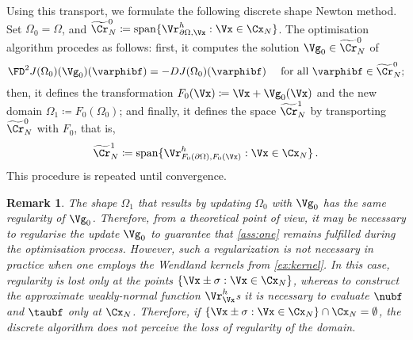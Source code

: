 \documentclass{siamart1116}
\newtheorem{remark}[theorem]{Remark}
\numberwithin{theorem}{section}
\begin{document}
Using this transport, we formulate the following discrete shape Newton method.
Set $\Omega_{0} = \Omega$, and
$\widetilde\Cr_N^0 \coloneqq \mathrm{span}\{\Vr^h_{\partial \Omega,\Vx}: \Vx\in \Cx_N\}$.
The optimisation algorithm procedes as follows:
first, it computes the solution $\Vg_0\in \widetilde\Cr_N^0$ of
\begin{equation}\label{eq:newton}
\FD^2J(\Omega_0)(\Vg_0)(\varphibf) = - DJ(\Omega_0)(\varphibf) \quad \text{ for all } \varphibf\in \widetilde\Cr_N^0;
\end{equation}
then, it defines the transformation $F_0(\Vx) \coloneqq \Vx + \Vg_0(\Vx)$ and the new domain
$\Omega_1\coloneqq F_0(\Omega_0)$; and finally, it defines the space $\widetilde\Cr_N^1$ by transporting $\widetilde\Cr_N^0$
with $F_0$, that is,
\begin{equation}
\widetilde\Cr_N^1 \coloneqq \mathrm{span}\{\Vr^h_{F_0(\partial \Omega),F_0(\Vx)}: \Vx\in \Cx_N\}\,.
\end{equation}
This procedure is repeated until convergence.

\begin{remark}
The shape $\Omega_1$ that results by updating $\Omega_0$ with $\Vg_0$
has the same regularity of $\Vg_0$. Therefore, from a theoretical point of view,
it may be necessary to regularise the update $\Vg_0$ to guarantee that
\cref{ass:one} remains fulfilled during the optimisation process. However,
such a regularization is not necessary in practice when
one employs the Wendland kernels from \cref{ex:kernel}. In this case,
regularity is lost only at the points $\{\Vx \pm \sigma : \Vx\in \Cx_N\}$,
whereas to construct the approximate weakly-normal function $\Vr_\Vx^h$s it
is necessary to evaluate $\nubf$ and $\taubf$ only at $\Cx_N$.
Therefore, if $\{\Vx \pm \sigma : \Vx\in \Cx_N\}\cap \Cx_N=\emptyset$,
the discrete algorithm does not perceive the loss of regularity of the domain.
\end{remark}
\end{document}
